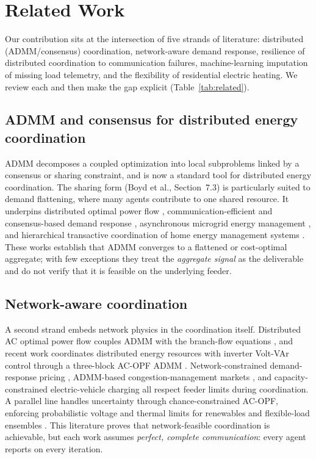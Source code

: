 \section{Related Work}
Our contribution sits at the intersection of five strands of literature:
distributed (ADMM/consensus) coordination, network-aware demand response,
resilience of distributed coordination to communication failures, machine-learning
imputation of missing load telemetry, and the flexibility of residential electric
heating. We review each and then make the gap explicit
(Table~\ref{tab:related}).

\subsection{ADMM and consensus for distributed energy coordination}
ADMM \cite{boyd2011admm} decomposes a coupled optimization into local
subproblems linked by a consensus or sharing constraint, and is now a standard
tool for distributed energy coordination. The sharing form
(Boyd et al., Section~7.3) is particularly suited to demand flattening, where many
agents contribute to one shared resource. It underpins distributed optimal power
flow \cite{Erseghe2014}, communication-efficient and consensus-based demand
response \cite{Tsai2017,Nguyen2018}, asynchronous microgrid energy management
\cite{Zheng2018}, and hierarchical transactive coordination of home energy
management systems \cite{Etedadi2024}. These works establish that ADMM converges
to a flattened or cost-optimal aggregate; with few exceptions they treat the
\emph{aggregate signal} as the deliverable and do not verify that it is feasible
on the underlying feeder.

\subsection{Network-aware coordination}
A second strand embeds network physics in the coordination itself. Distributed
AC optimal power flow couples ADMM with the branch-flow equations
\cite{Mhanna2019}, and recent work coordinates distributed energy resources with
inverter Volt-VAr control through a three-block AC-OPF ADMM \cite{Gebbran2023}.
Network-constrained demand-response pricing \cite{Mieth2020}, ADMM-based
congestion-management markets \cite{Shen2020}, and capacity-constrained electric-vehicle
charging \cite{Ma2018} all respect feeder limits during coordination. A
parallel line handles uncertainty through chance-constrained AC-OPF, enforcing
probabilistic voltage and thermal limits for renewables \cite{DallAnese2017} and
flexible-load ensembles \cite{Hassan2019}. This literature proves that
network-feasible coordination is achievable, but each work assumes
\emph{perfect, complete communication}: every agent reports on every iteration.

